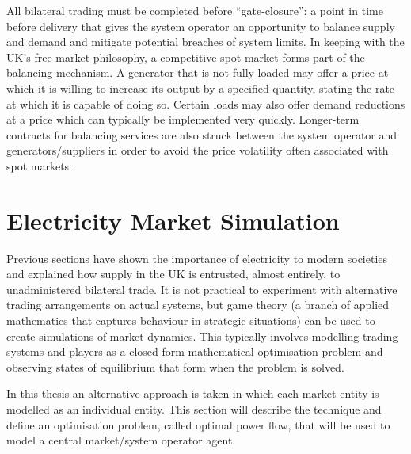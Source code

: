 All bilateral trading must be completed before ``gate-closure'': a point in time
before delivery that gives the system operator an opportunity to balance supply
and demand and mitigate potential breaches of system limits.  In keeping with
the UK's free market philosophy, a competitive spot market \cite{schweppe:spot}
forms part of the balancing mechanism.  A generator that is not fully loaded
may offer a price at which it is willing to increase its output by a specified
quantity, stating the rate at which it is capable of doing so.  Certain loads
may also offer demand reductions at a price which can typically be implemented
very quickly.  Longer-term contracts for balancing services are also struck
between the system operator and generators/suppliers in order to avoid the price
volatility often associated with spot markets \cite{kirschen:book}.


\section{Electricity Market Simulation}

Previous sections have shown the importance of electricity to modern societies
and explained how supply in the UK is entrusted, almost entirely, to
unadministered bilateral trade. It is not practical to experiment with
alternative trading arrangements on actual systems, but game theory (a branch of
applied mathematics that captures behaviour in strategic situations) can be used
to create simulations of market dynamics.  This typically involves modelling
trading systems and players as a closed-form mathematical optimisation problem
and observing states of equilibrium that form when the problem is
solved.

In this thesis an alternative approach is taken in which each market entity is
modelled as an individual entity.  This section will describe the technique and
define an optimisation problem, called optimal power flow, that will be used to
model a central market/system operator agent.


